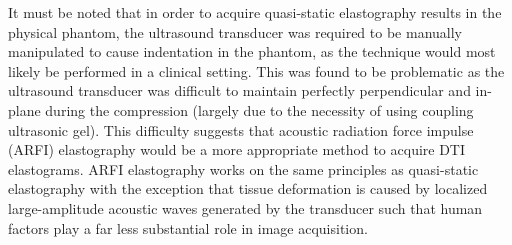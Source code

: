 			It must be noted that in order to acquire quasi-static elastography results in the physical phantom, the ultrasound transducer was required to be manually manipulated to cause indentation in the phantom, as the technique would most likely be performed in a clinical setting. This was found to be problematic as the ultrasound transducer was difficult to maintain perfectly perpendicular and in-plane during the compression (largely due to the necessity of using coupling ultrasonic gel). This difficulty suggests that acoustic radiation force impulse (ARFI) elastography would be a more appropriate method to acquire DTI elastograms. ARFI elastography works on the same principles as quasi-static elastography with the exception that tissue deformation is caused by localized large-amplitude acoustic waves generated by the transducer such that human factors play a far less substantial role in image acquisition.

	\cleardoublepage


	
	